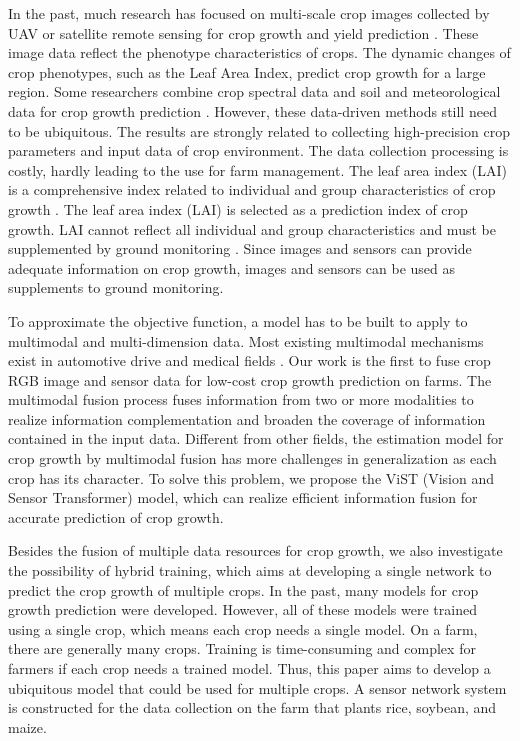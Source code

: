 \documentclass[acmsmall, screen]{acmart}
\begin{document}
In the past, much research has focused on multi-scale crop images collected by UAV or satellite remote sensing for crop growth and yield prediction \cite{wang_new_2022,yue_estimate_2019,turkoglu_crop_2021}. These image data reflect the phenotype characteristics of crops. The dynamic changes of crop phenotypes, such as the Leaf Area Index, predict crop growth for a large region. Some researchers combine crop spectral data and soil and meteorological data for crop growth prediction \cite{trnka_effect_2007,islam_deep_2018,adisa_application_2019,liu_neural_2001,matsumura_maize_2015}. However, these data-driven methods still need to be ubiquitous. The results are strongly related to collecting high-precision crop parameters and input data of crop environment. The data collection processing is costly, hardly leading to the use for farm management. The leaf area index (LAI) is a comprehensive index related to individual and group characteristics of crop growth \cite{__1999}. The leaf area index (LAI) is selected as a prediction index of crop growth. LAI cannot reflect all individual and group characteristics and must be supplemented by ground monitoring \cite{carlson_relation_1997}. Since images and sensors can provide adequate information on crop growth, images and sensors can be used as supplements to ground monitoring. 

To approximate the objective function, a model has to be built to apply to multimodal and multi-dimension data. Most existing multimodal mechanisms exist in automotive drive and medical fields \cite{guo2019deep, xiao2020multimodal}. Our work is the first to fuse crop RGB image and sensor data for low-cost crop growth prediction on farms. The multimodal fusion process fuses information from two or more modalities to realize information complementation and broaden the coverage of information contained in the input data. Different from other fields, the estimation model for crop growth by multimodal fusion has more challenges in generalization as each crop has its character. To solve this problem, we propose the ViST (Vision and Sensor Transformer) model, which can realize efficient information fusion for accurate prediction of crop growth.

Besides the fusion of multiple data resources for crop growth, we also investigate the possibility of hybrid training, which aims at developing a single network to predict the crop growth of multiple crops. In the past, many models for crop growth prediction were developed. However, all of these models were trained using a single crop, which means each crop needs a single model. On a farm, there are generally many crops. Training is time-consuming and complex for farmers if each crop needs a trained model. Thus, this paper aims to develop a ubiquitous model that could be used for multiple crops. A sensor network system is constructed for the data collection on the farm that plants rice, soybean, and maize.
\end{document}
